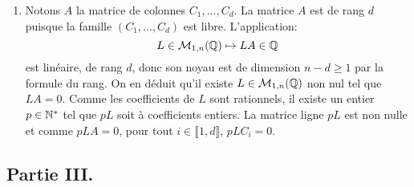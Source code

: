 \begin{enumerate}
\item Notons $A$ la matrice de colonnes $C_{1}, ..., C_{d}$. La matrice $A$ est de rang $d$ puisque la famille $(C_{1}, ..., C_{d})$ est libre. L'application:
\[ L\in \mathcal{M}_{1,n}(\mathbb{Q}) \mapsto LA\in \mathbb{Q}\]
est linéaire, de rang $d$, donc son noyau est de dimension $n-d \geq 1$ par la formule du rang. On en déduit qu'il existe $L\in \mathcal{M}_{1,n}(\mathbb{Q})$ non nul tel que $LA = 0$. Comme les coefficients de $L$ sont rationnels, il existe un entier 
$p\in \mathbb{N}^{*}$ tel que $pL$ soit à coefficients entiers. La matrice ligne $pL$ est non nulle et comme $pLA = 0$, pour tout $i\in \llbracket 1, d\rrbracket$, $pLC_{i} = 0$. 
 

\end{enumerate}

\subsection*{Partie III.}

